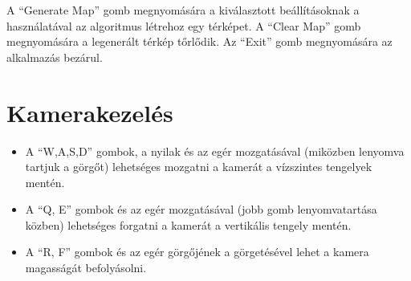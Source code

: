 \noindent A “Generate Map” gomb megnyomására a kiválasztott beállításoknak a használatával az algoritmus létrehoz egy térképet. A “Clear Map” gomb megnyomására a legenerált térkép tőrlődik. Az “Exit” gomb megnyomására az alkalmazás bezárul.

\section*{Kamerakezelés}

\begin{itemize}
\item A “W,A,S,D” gombok, a nyilak és az egér mozgatásával (miközben lenyomva tartjuk a görgőt) lehetséges mozgatni a kamerát a vízszintes tengelyek mentén.
\item A “Q, E” gombok és az egér mozgatásával (jobb gomb lenyomvatartása közben) lehetséges forgatni a kamerát a vertikális tengely mentén.
\item A “R, F” gombok és az egér görgőjének a görgetésével lehet a kamera magasságát befolyásolni.

\end{itemize}
